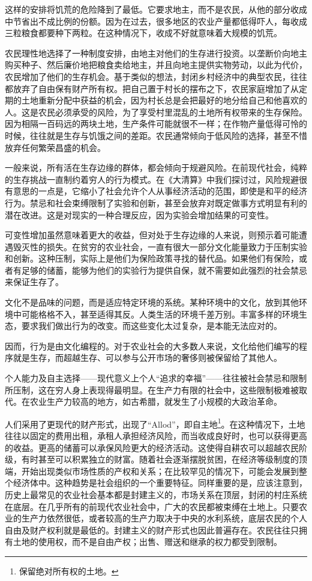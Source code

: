 这样的安排将饥荒的危险降到了最低。它要求地主，而不是农民，从他的部分收成中节省出不成比例的份额。因为在过去，很多地区的农业产量都低得吓人，每收成三粒粮食都要种下两粒。在这种情况下，收成不好就意味着大规模的饥荒。

农民理性地选择了一种制度安排，由地主对他们的生存进行投资。以垄断价向地主购买种子、然后廉价地把粮食卖给地主，并且向地主提供实物劳动，以此为代价，农民增加了他们的生存机会。基于类似的想法，封闭乡村经济中的典型农民，往往都放弃了自由保有财产所有权。把自己置于村长的摆布之下，农民家庭增加了从定期的土地重新分配中获益的机会，因为村长总是会把最好的地分给自己和他喜欢的人。这是农民必须承受的风险，为了享受村里混乱的土地所有权带来的生存保险。因为相隔一百码远的两块土地，生产条件可能就很不一样；在作物产量低得可怜的时候，往往就是生存与饥饿之间的差距。农民通常倾向于低风险的选择，甚至不惜放弃任何繁荣昌盛的机会。

一般来说，所有活在生存边缘的群体，都会倾向于规避风险。在前现代社会，纯粹的生存挑战一直制约着穷人的行为模式。在《大清算》中我们探讨过，风险规避很有意思的一点是，它缩小了社会允许个人从事经济活动的范围，即使是和平的经济行为。禁忌和社会束缚限制了实验和创新，甚至会放弃对既定做事方式明显有利的潜在改进。这是对现实的一种合理反应，因为实验会增加结果的可变性。

可变性增加虽然意味着更大的收益，但对处于生存边缘的人来说，则预示着可能遭遇毁灭性的损失。在贫穷的农业社会，一直有很大一部分文化能量致力于压制实验和创新。这种压制，实际上是他们为保险政策寻找的替代品。如果他们有保险，或者有足够的储蓄，能够为他们的实验行为提供自保，就不需要如此强烈的社会禁忌来保证生存了。

文化不是品味的问题，而是适应特定环境的系统。某种环境中的文化，放到其他环境中可能格格不入，甚至适得其反。人类生活的环境千差万别。丰富多样的环境生态，要求我们做出行为的改变。而这些变化太过复杂，是本能无法应对的。

因而，行为是由文化编程的。对于农业社会的大多数人来说，文化给他们编写的程序就是生存，而超越生存、可以参与公开市场的奢侈则被保留给了其他人。

个人能力及自主选择——现代意义上个人“追求的幸福”——往往被社会禁忌和限制所压制，这在穷人身上表现得最明显。在生产力有限的社会中，这些限制极难被取代。在农业生产力较高的地方，如古希腊，就发生了小规模的大政治革命。

人们采用了更现代的财产形式，出现了“Allod”，即自主地\footnote{保留绝对所有权的土地。}。在这种情况下，土地往往以固定的费用出租，承租人承担经济风险，而当收成良好时，也可以获得更高的收益。更高的储蓄可以承保风险更大的经济活动。这使得自耕农可以超越农民阶级，有时甚至可以积累独立的财富。随着社会逐渐摆脱贫困，在经济等级制度的顶端，开始出现类似市场性质的产权和关系；在比较罕见的情况下，可能会发展到整个经济体中。这种趋势是社会组织的一个重要特征。同样重要的是，应该注意到，历史上最常见的农业社会基本都是封建主义的，市场关系在顶层，封闭的村庄系统在底层。在几乎所有的前现代农业社会中，广大的农民都被束缚在土地上。只要农业的生产力依然很低，或者较高的生产力取决于中央的水利系统，底层农民的个人自由及财产权利就是最低的。封建主义的财产形式也因此普遍存在。农民往往只拥有土地的使用权，而不是自由产权；出售、赠送和继承的权力都受到限制。

